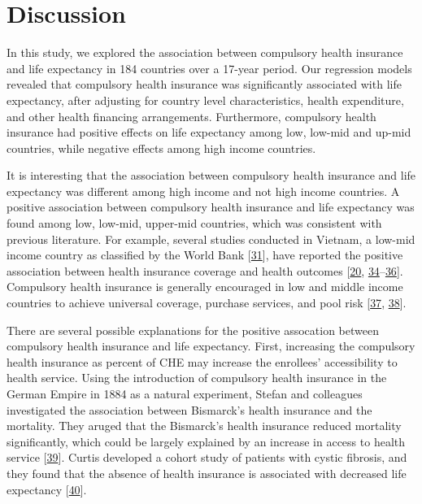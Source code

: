 \documentclass[]{elsarticle} %
\begin{document}
\hypertarget{discussion}{%
\section{Discussion}\label{discussion}}

In this study, we explored the association between compulsory health insurance and life expectancy in 184 countries over a 17-year period.
Our regression models revealed that compulsory health insurance was significantly associated with life expectancy, after adjusting for country level characteristics, health expenditure, and other health financing arrangements.
Furthermore, compulsory health insurance had positive effects on life expectancy among low, low-mid and up-mid countries, while negative effects among high income countries.

It is interesting that the association between compulsory health insurance and life expectancy was different among high income and not high income countries. A positive association between compulsory health insurance and life expectancy was found among low, low-mid, upper-mid countries, which was consistent with previous literature. For example, several studies conducted in Vietnam, a low-mid income country as classified by the World Bank {[}\protect\hyperlink{ref-worldbankincome}{31}{]}, have reported the positive association between health insurance coverage and health outcomes {[}\protect\hyperlink{ref-jowett2003impact}{20}, \protect\hyperlink{ref-jowett2004health}{34}--\protect\hyperlink{ref-Nguyen2012}{36}{]}. Compulsory health insurance is generally encouraged in low and middle income countries to achieve universal coverage, purchase services, and pool risk {[}\protect\hyperlink{ref-barnighausen2002one}{37}, \protect\hyperlink{ref-lagomarsino2012moving}{38}{]}.

There are several possible explanations for the positive assocation between compulsory health insurance and life expectancy. First, increasing the compulsory health insurance as percent of CHE may increase the enrollees' accessibility to health service. Using the introduction of compulsory health insurance in the German Empire in 1884 as a natural experiment, Stefan and colleagues investigated the association between Bismarck's health insurance and the mortality. They aruged that the Bismarck's health insurance reduced mortality significantly, which could be largely explained by an increase in access to health service {[}\protect\hyperlink{ref-bauernschuster2017bismarck}{39}{]}. Curtis developed a cohort study of patients with cystic fibrosis, and they found that the absence of health insurance is associated with decreased life expectancy {[}\protect\hyperlink{ref-Curtis1997}{40}{]}.
\end{document}
